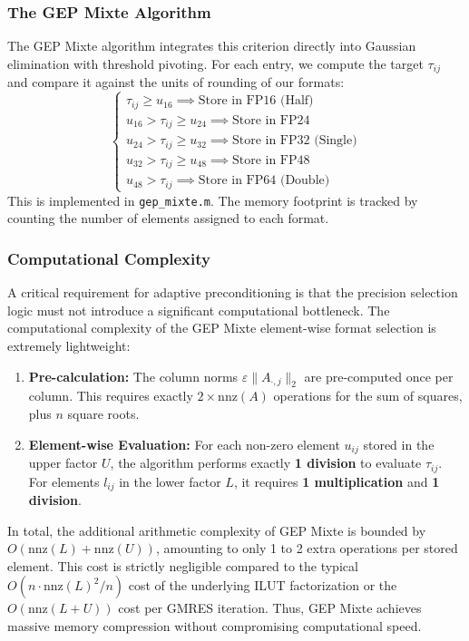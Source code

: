 \documentclass[11pt,a4paper]{article}
\begin{document}
\subsubsection{The GEP Mixte Algorithm}
The GEP Mixte algorithm integrates this criterion directly into Gaussian elimination with threshold pivoting. For each entry, we compute the target $\tau_{ij}$ and compare it against the units of rounding of our formats:
\begin{equation}
    \begin{cases}
        \tau_{ij} \ge u_{16} \implies \text{Store in FP16 (Half)} \\
        u_{16} > \tau_{ij} \ge u_{24} \implies \text{Store in FP24} \\
        u_{24} > \tau_{ij} \ge u_{32} \implies \text{Store in FP32 (Single)} \\
        u_{32} > \tau_{ij} \ge u_{48} \implies \text{Store in FP48} \\
        u_{48} > \tau_{ij} \implies \text{Store in FP64 (Double)}
    \end{cases}
\end{equation}
This is implemented in \texttt{gep\_mixte.m}. The memory footprint is tracked by counting the number of elements assigned to each format.

\subsubsection{Computational Complexity}
A critical requirement for adaptive preconditioning is that the precision selection logic must not introduce a significant computational bottleneck. The computational complexity of the GEP Mixte element-wise format selection is extremely lightweight:
\begin{enumerate}
    \item \textbf{Pre-calculation:} The column norms $\varepsilon \|A_{\cdot,j}\|_2$ are pre-computed once per column. This requires exactly $2 \times \text{nnz}(A)$ operations for the sum of squares, plus $n$ square roots.
    \item \textbf{Element-wise Evaluation:} For each non-zero element $u_{ij}$ stored in the upper factor $U$, the algorithm performs exactly \textbf{1 division} to evaluate $\tau_{ij}$. For elements $l_{ij}$ in the lower factor $L$, it requires \textbf{1 multiplication} and \textbf{1 division}.
\end{enumerate}
In total, the additional arithmetic complexity of GEP Mixte is bounded by $O(\text{nnz}(L) + \text{nnz}(U))$, amounting to only 1 to 2 extra operations per stored element. This cost is strictly negligible compared to the typical $O(n \cdot \text{nnz}(L)^2/n)$ cost of the underlying ILUT factorization or the $O(\text{nnz}(L+U))$ cost per GMRES iteration. Thus, GEP Mixte achieves massive memory compression without compromising computational speed.
\end{document}

